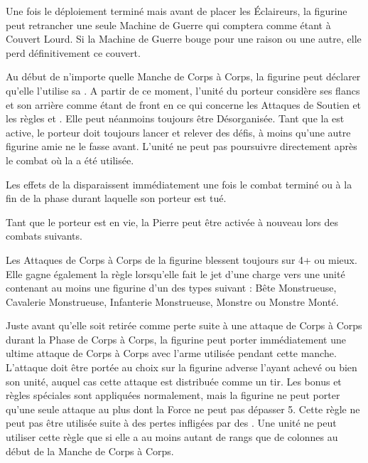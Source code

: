 \armyspecialruleentry{\entrench}

Une fois le déploiement terminé mais avant de placer les Éclaireurs, la figurine peut retrancher une seule Machine de Guerre qui comptera comme étant à Couvert Lourd. Si la Machine de Guerre bouge pour une raison ou une autre, elle perd définitivement ce couvert.

\armyspecialruleentry{\holdstone}

Au début de n'importe quelle Manche de Corps à Corps, la figurine peut déclarer qu'elle l'utilise sa \holdstone{}. A partir de ce moment, l'unité du porteur considère ses flancs et son arrière comme étant de front en ce qui concerne les Attaques de Soutien et les règles \parry{} et \shieldwall{}. Elle peut néanmoins toujours être Désorganisée. Tant que la \holdstone{} est active, le porteur doit toujours lancer et relever des défis, à moins qu'une autre figurine amie ne le fasse avant. L'unité ne peut pas poursuivre directement après le combat où la \holdstone{} a été utilisée.

Les effets de la \holdstone{} disparaissent immédiatement une fois le combat terminé ou à la fin de la phase durant laquelle son porteur est tué.

Tant que le porteur est en vie, la Pierre peut être activée à nouveau lors des combats suivants.

\armyspecialruleentry{\thebiggertheyare}

Les Attaques de Corps à Corps de la figurine blessent toujours sur 4+ ou mieux. Elle gagne également la règle \swiftstride{} lorsqu'elle fait le jet d'une charge vers une unité contenant au moins une figurine d'un des types suivant : Bête Monstrueuse, Cavalerie Monstrueuse, Infanterie Monstrueuse, Monstre ou Monstre Monté.

\armyspecialruleentry{\comewithme}

Juste avant qu'elle soit retirée comme perte suite à une attaque de Corps à Corps durant la Phase de Corps à Corps, la figurine peut porter immédiatement une ultime attaque de Corps à Corps avec l'arme utilisée pendant cette manche. L'attaque doit être portée au choix sur la figurine adverse l'ayant achevé ou bien son unité, auquel cas cette attaque est distribuée comme un tir. Les bonus et règles spéciales sont appliquées normalement, mais la figurine ne peut porter qu'une seule attaque au plus dont la Force ne peut pas dépasser 5. Cette règle ne peut pas être utilisée suite à des pertes infligées par des \impacthits{}. Une unité ne peut utiliser cette règle que si elle a au moins autant de rangs que de colonnes au début de la Manche de Corps à Corps.

